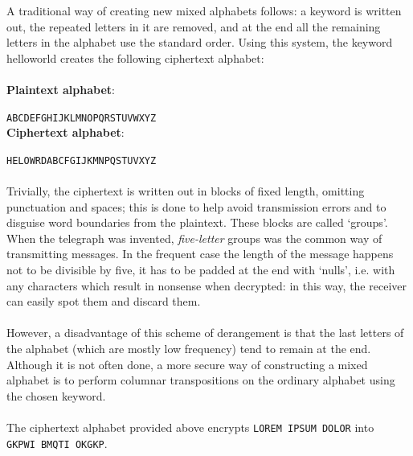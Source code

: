 \documentclass[Lau,binding=0.6cm,oneside]{sapthesis}
\begin{document}
A traditional way of creating new mixed alphabets follows: a keyword is written out, the repeated letters in it are removed, and at the end all the remaining letters in the alphabet use the standard order. Using this system, the keyword \textsf{helloworld} creates the following ciphertext alphabet:\\\\
	\textbf{\small{Plaintext alphabet}}: \par\colorbox{gray!12}{\small{\texttt{ABCDEFGHIJKLMNOPQRSTUVWXYZ}}}\\
	\textbf{\small{Ciphertext alphabet}}:	\par\colorbox{gray!12}{\small{\texttt{HELOWRDABCFGIJKMNPQSTUVXYZ}}}\\
\ \\
Trivially, the ciphertext is written out in blocks of fixed length, omitting punctuation and spaces; this is done to help avoid transmission errors and to disguise word boundaries from the plaintext. These blocks are called `groups'. When the telegraph was invented, \textit{five-letter} groups was the common way of transmitting messages. In the frequent case the length of the message happens not to be divisible by five, it has to be padded at the end with `nulls', i.e. with any characters which result in nonsense when decrypted: in this way, the receiver can easily spot them and discard them. \\\\
However, a disadvantage of this scheme of derangement is that the last letters of the alphabet (which are mostly low frequency) tend to remain at the end. Although it is not often done, a more secure way of constructing a mixed alphabet is to perform columnar transpositions on the ordinary alphabet using the chosen keyword.\\\\
The ciphertext alphabet provided above encrypts \colorbox{gray!12}{\small{\texttt{LOREM IPSUM DOLOR}}}
into\\ \colorbox{gray!12}{\small{\texttt{GKPWI BMQTI OKGKP}}}.
\end{document}
